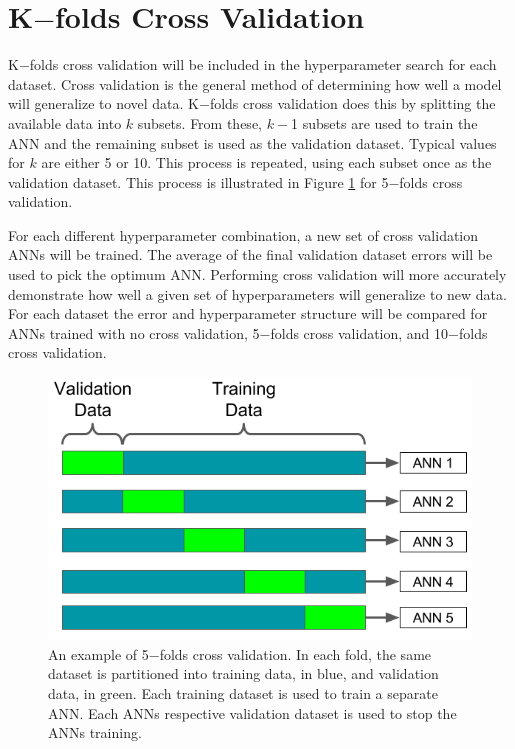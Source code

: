 \documentclass[tocnosub,noragright,centerchapter,12pt,fullpage]{uiucecethesis09}
\begin{document}





\section{K$-$folds Cross Validation} \label{CrossValidation}

K$-$folds cross validation will be included in the hyperparameter search for each dataset. Cross validation is the general method of determining how well a model will generalize to novel data. K$-$folds cross validation does this by splitting the available data into $k$ subsets. From these, $k-$1 subsets are used to train the ANN and the remaining subset is used as the validation dataset. Typical values for $k$ are either 5 or 10. This process is repeated, using each subset once as the validation dataset. This process is illustrated in Figure \ref{fig:kfolds_example} for 5$-$folds cross validation. 

For each different hyperparameter combination, a new set of cross validation ANNs will be trained. The average of the final validation dataset errors will be used to pick the optimum ANN. Performing cross validation will more accurately demonstrate how well a given set of hyperparameters will generalize to new data. For each dataset the error and hyperparameter structure will be compared for ANNs trained with no cross validation, 5$-$folds cross validation, and 10$-$folds cross validation.



\begin{figure}[H]
\centering
\includegraphics[width=0.6\linewidth]{images/kfolds_example}
\caption{An example of 5$-$folds cross validation. In each fold, the same dataset is partitioned into training data, in blue, and validation data, in green. Each training dataset is used to train a separate ANN. Each ANNs respective validation dataset is used to stop the ANNs training.}
\label{fig:kfolds_example}
\end{figure}
\end{document}
